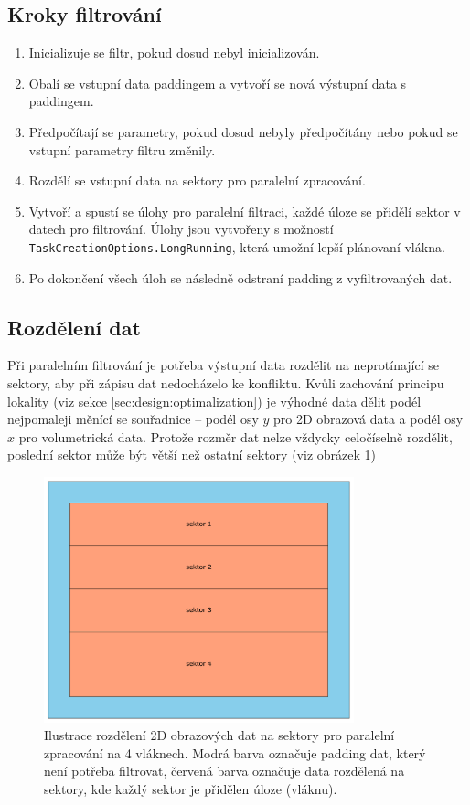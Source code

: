\subsection*{Kroky filtrování}
\begin{enumerate}
    \item Inicializuje se filtr, pokud dosud nebyl inicializován.
    \item Obalí se vstupní data paddingem a vytvoří se nová výstupní data s paddingem.
    \item Předpočítají se parametry, pokud dosud nebyly předpočítány nebo pokud se vstupní parametry filtru změnily.
    \item Rozdělí se vstupní data na sektory pro paralelní zpracování.
    \item Vytvoří a spustí se úlohy pro paralelní filtraci, každé úloze se přidělí sektor v datech pro filtrování. Úlohy jsou vytvořeny s možností \texttt{TaskCreationOptions.LongRunning}, která umožní lepší plánovaní vlákna.
    \item Po dokončení všech úloh se následně odstraní padding z vyfiltrovaných dat.
\end{enumerate}

\subsection*{Rozdělení dat}
Při paralelním filtrování je potřeba výstupní data rozdělit na neprotínající se sektory, aby při zápisu dat nedocházelo ke konfliktu. Kvůli zachování principu lokality (viz sekce \ref{sec:design:optimalization}) je výhodné data dělit podél nejpomaleji měnící se souřadnice -- podél osy $y$ pro 2D obrazová data a podél osy $x$ pro volumetrická data. Protože rozměr dat nelze vždycky celočíselně rozdělit, poslední sektor může být větší než ostatní sektory (viz obrázek \ref{fig:impl:split})

\begin{figure} [H]
    \centering
    \label{fig:impl:split}
    \includegraphics[width=0.80\textwidth]{figures/split.pdf}
    \caption{Ilustrace rozdělení 2D obrazových dat na sektory pro paralelní zpracování na 4 vláknech. Modrá barva označuje padding dat, který není potřeba filtrovat, červená barva označuje data rozdělená na sektory, kde každý sektor je přidělen úloze (vláknu).}
\end{figure}

